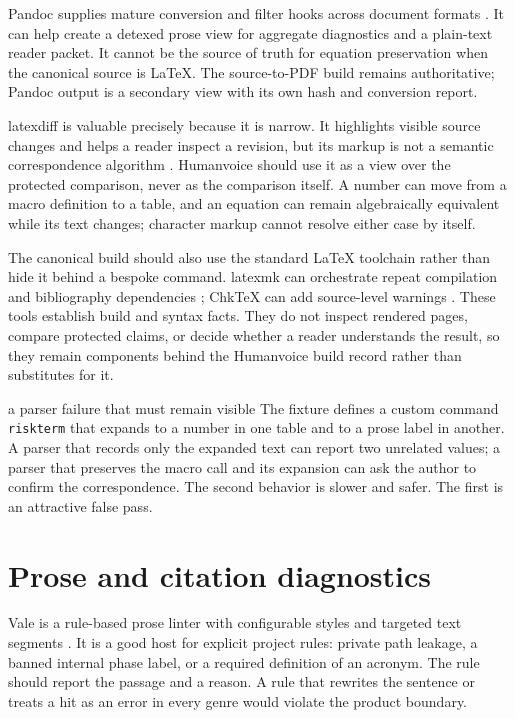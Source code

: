 Pandoc supplies mature conversion and filter hooks across document formats
\citep{pandoc2026filters}. It can help create a detexed prose view for
aggregate diagnostics and a plain-text reader packet. It cannot be the source
of truth for equation preservation when the canonical source is LaTeX. The
source-to-PDF build remains authoritative; Pandoc output is a secondary view
with its own hash and conversion report.

latexdiff is valuable precisely because it is narrow. It highlights visible
source changes and helps a reader inspect a revision, but its markup is not a
semantic correspondence algorithm \citep{latexdiff2026}. Humanvoice should
use it as a view over the protected comparison, never as the comparison
itself. A number can move from a macro definition to a table, and an equation
can remain algebraically equivalent while its text changes; character markup
cannot resolve either case by itself.

The canonical build should also use the standard LaTeX toolchain rather than
hide it behind a bespoke command. latexmk can orchestrate repeat compilation
and bibliography dependencies \citep{latexmk2026}; ChkTeX can add source-level
warnings \citep{chktex2026}. These tools establish build and syntax facts. They
do not inspect rendered pages, compare protected claims, or decide whether a
reader understands the result, so they remain components behind the Humanvoice
build record rather than substitutes for it.

\begin{cardexample}{a parser failure that must remain visible}
The fixture defines a custom command \texttt{\\riskterm} that expands to a
number in one table and to a prose label in another. A parser that records only
the expanded text can report two unrelated values; a parser that preserves the
macro call and its expansion can ask the author to confirm the correspondence.
The second behavior is slower and safer. The first is an attractive false pass.
\end{cardexample}

\section{Prose and citation diagnostics}
\label{sec:software-prose}

Vale is a rule-based prose linter with configurable styles and targeted text
segments \citep{vale2026docs}. It is a good host for explicit project rules:
private path leakage, a banned internal phase label, or a required definition
of an acronym. The rule should report the passage and a reason. A rule that
rewrites the sentence or treats a hit as an error in every genre would violate
the product boundary.

